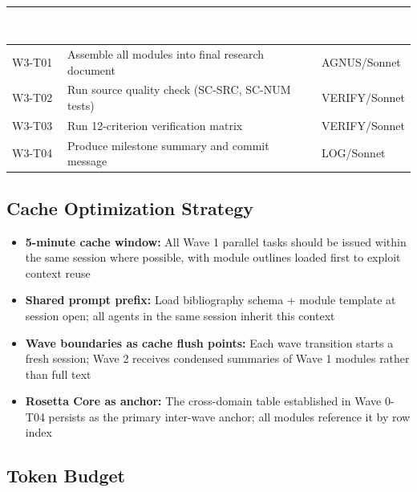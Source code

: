 \documentclass[11pt,letterpaper]{article}
\newcommand{\tableheader}[1]{\textbf{\sffamily\textcolor{white}{#1}}}
\begin{document}
\begin{center}
\begin{tabularx}{\textwidth}{L{2.5cm}XC{2cm}}
\toprule
{}
\tableheader{Task ID} & \tableheader{Task} & \tableheader{Agent} \\
\midrule
W3-T01 & Assemble all modules into final research document & AGNUS/Sonnet \\
W3-T02 & Run source quality check (SC-SRC, SC-NUM tests) & VERIFY/Sonnet \\
W3-T03 & Run 12-criterion verification matrix & VERIFY/Sonnet \\
W3-T04 & Produce milestone summary and commit message & LOG/Sonnet \\
\bottomrule
\end{tabularx}
\end{center}

\subsection{Cache Optimization Strategy}

\begin{itemize}[leftmargin=2em]
  \item \textbf{5-minute cache window:} All Wave 1 parallel tasks should be issued within the same session where possible, with module outlines loaded first to exploit context reuse
  \item \textbf{Shared prompt prefix:} Load bibliography schema + module template at session open; all agents in the same session inherit this context
  \item \textbf{Wave boundaries as cache flush points:} Each wave transition starts a fresh session; Wave 2 receives condensed summaries of Wave 1 modules rather than full text
  \item \textbf{Rosetta Core as anchor:} The cross-domain table established in Wave 0-T04 persists as the primary inter-wave anchor; all modules reference it by row index
\end{itemize}

\subsection{Token Budget}
\end{document}

